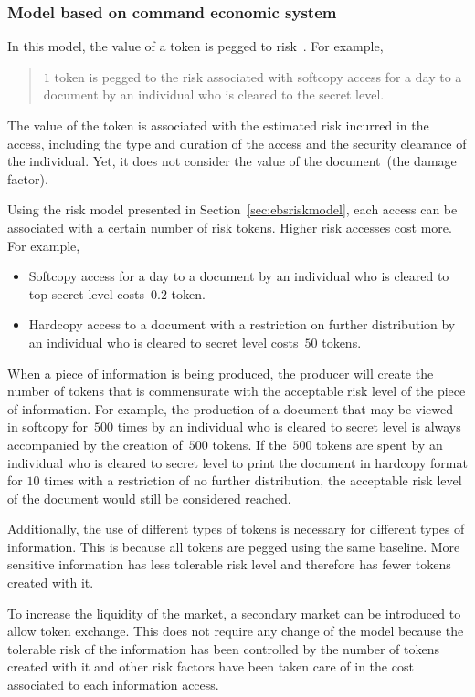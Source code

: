 \subsubsection{Model based on command economic system}
\label{sec:ebscommandeconomysystem}
In this model, the value of a token is pegged to
risk~\cite{JPO04}. For example,
\begin{quote}
  $1$ token is pegged to the risk associated with softcopy access for
  a day to a document by an individual who is cleared to the secret
  level.
\label{def:ebstoken}
\end{quote}
The value of the token is associated with the estimated risk incurred
in the access, including the type and duration of the access and the
security clearance of the individual. Yet, it does not consider the
value of the document~(the damage factor).

Using the risk model presented in Section~\ref{sec:ebsriskmodel}, each
access can be associated with a certain number of risk tokens. Higher
risk accesses cost more. For example,
\begin{itemize}
\item Softcopy access for a day to a document by an individual who is
  cleared to top secret level costs~$0.2$ token.
\item Hardcopy access to a document with a restriction on further
  distribution by an individual who is cleared to secret level
  costs~$50$ tokens.
\end{itemize}
When a piece of information is being produced, the producer will
create the number of tokens that is commensurate with the acceptable
risk level of the piece of information. For example, the production of
a document that may be viewed in softcopy for~$500$ times by an
individual who is cleared to secret level is always accompanied by the
creation of~$500$ tokens. If the~$500$ tokens are spent by an
individual who is cleared to secret level to print the document in
hardcopy format for $10$ times with a restriction of no further
distribution, the acceptable risk level of the document would still be
considered reached.

Additionally, the use of different types of tokens is necessary for
different types of information. This is because all tokens are pegged
using the same baseline. More sensitive information has less tolerable
risk level and therefore has fewer tokens created with it.

To increase the liquidity of the market, a secondary market can be
introduced to allow token exchange. This does not require any change
of the model because the tolerable risk of the information has been
controlled by the number of tokens created with it and other risk
factors have been taken care of in the cost associated to each
information access.

